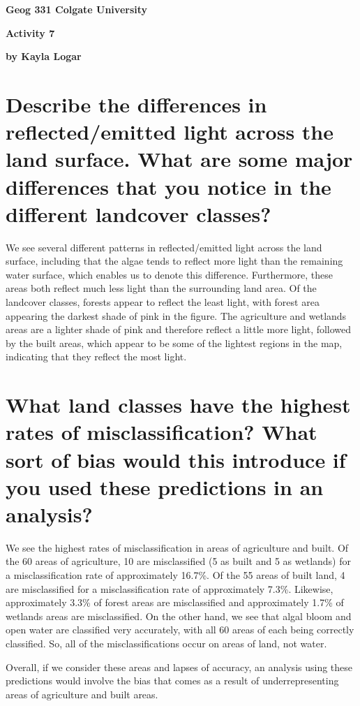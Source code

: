 \documentclass[11pt]{article}
\begin{document}
\pagestyle{empty}    %

\Large
{\bf Geog 331 \hfill Colgate University}
\normalsize
\centerline{\bf Activity 7}
\centerline{\bf by Kayla Logar}   %


\section{Describe the differences in reflected/emitted light across the land surface. What are some major differences that you notice in the different landcover classes?
}  %
We see several different patterns in reflected/emitted light across the land surface, including that the algae tends to reflect more light than the remaining water surface, which enables us to denote this difference. Furthermore, these areas both reflect much less light than the surrounding land area. Of the landcover classes, forests appear to reflect the least light, with forest area appearing the darkest shade of pink in the figure. The agriculture and wetlands areas are a lighter shade of pink and therefore reflect a little more light, followed by the built areas, which appear to be some of the lightest regions in the map, indicating that they reflect the most light.


\section{What land classes have the highest rates of misclassification? What sort of bias would this introduce if you used these predictions in an analysis?}

We see the highest rates of misclassification in areas of agriculture and built. Of the 60 areas of agriculture, 10 are misclassified (5 as built and 5 as wetlands) for a misclassification rate of approximately 16.7\%. Of the 55 areas of built land, 4 are misclassified for a misclassification rate of approximately 7.3\%. Likewise, approximately 3.3\% of forest areas are misclassified and approximately 1.7\% of wetlands areas are misclassified. On the other hand, we see that algal bloom and open water are classified very accurately, with all 60 areas of each being correctly classified. So, all of the misclassifications occur on areas of land, not water.

Overall, if we consider these areas and lapses of accuracy, an analysis using these predictions would involve the bias that comes as a result of underrepresenting areas of agriculture and built areas.
\end{document}
